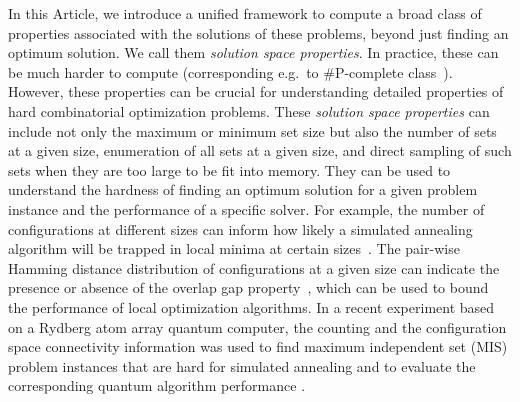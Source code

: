 \documentclass[review, onefignum, onetabnum]{siamart190516}
\begin{document}
In this Article, we introduce a unified framework to compute a broad class of properties 
associated with the solutions of these problems, beyond just finding an optimum solution.
We call them \textit{solution space properties}. In practice, these can be much harder to compute (corresponding e.g.\ to \#P-complete class~\cite{Moore2011}). However, these properties can be crucial for understanding detailed properties of hard combinatorial optimization problems.
These \textit{solution space properties} can include not only the maximum or minimum set size but also the number of sets at a given size, enumeration of all sets at a given size, and direct sampling of such sets when they are too large to be fit into memory.
They can be used to understand the hardness of finding an optimum solution for a given problem instance and the performance of a specific solver.  
For example, the number of configurations at different sizes can inform how likely a simulated annealing algorithm will be trapped in local minima at certain sizes~\cite{Xu2018}.
The pair-wise Hamming distance distribution of configurations at a given size can indicate the presence or absence of the overlap gap property~\cite{Gamarnik2013, Gamarnik2019}, which can be used to bound the performance of local optimization algorithms.
In a recent experiment based on a Rydberg atom array quantum computer, 
the counting and the configuration space connectivity information was used to find maximum independent set (MIS) problem instances that are hard for simulated annealing and to evaluate the corresponding quantum algorithm performance \cite{Ebadi2022}.
\end{document}
